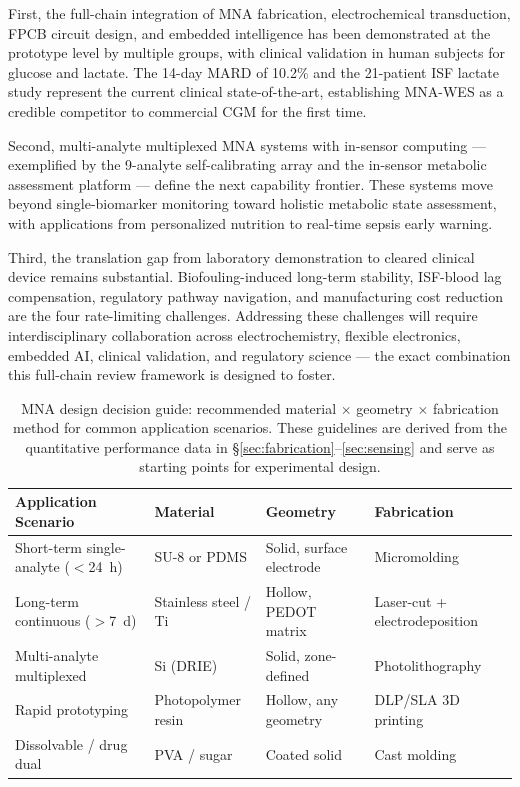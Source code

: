 \documentclass[review,1p]{elsarticle}
\begin{document}
First, the full-chain integration of MNA fabrication, electrochemical transduction, FPCB circuit design, and embedded intelligence has been demonstrated at the prototype level by multiple groups, with clinical validation in human subjects for glucose and lactate. The 14-day MARD of 10.2\% \cite{Yang2023CGM14day} and the 21-patient ISF lactate study \cite{Djassemi2026ACSsens} represent the current clinical state-of-the-art, establishing MNA-WES as a credible competitor to commercial CGM for the first time.

Second, multi-analyte multiplexed MNA systems with in-sensor computing — exemplified by the 9-analyte self-calibrating array \cite{Li2025Innovation} and the in-sensor metabolic assessment platform \cite{Fan2026EdgeAI} — define the next capability frontier. These systems move beyond single-biomarker monitoring toward holistic metabolic state assessment, with applications from personalized nutrition to real-time sepsis early warning.

Third, the translation gap from laboratory demonstration to cleared clinical device remains substantial. Biofouling-induced long-term stability, ISF-blood lag compensation, regulatory pathway navigation, and manufacturing cost reduction are the four rate-limiting challenges. Addressing these challenges will require interdisciplinary collaboration across electrochemistry, flexible electronics, embedded AI, clinical validation, and regulatory science — the exact combination this full-chain review framework is designed to foster.


\begin{table}[htbp]
\centering
\small
\caption{MNA design decision guide: recommended material $\times$ geometry $\times$ fabrication method for common application scenarios. These guidelines are derived from the quantitative performance data in \S\ref{sec:fabrication}--\ref{sec:sensing} and serve as starting points for experimental design.}
\label{tab:design_guide}
\begin{tabular}{p{3.5cm}p{3cm}p{3cm}p{3cm}}
\toprule
\textbf{Application Scenario} & \textbf{Material} & \textbf{Geometry} & \textbf{Fabrication} \\
\midrule
Short-term single-analyte ($<$24~h) & SU-8 or PDMS & Solid, surface electrode & Micromolding \\
Long-term continuous ($>$7~d) & Stainless steel / Ti & Hollow, PEDOT matrix & Laser-cut + electrodeposition \\
Multi-analyte multiplexed & Si (DRIE) & Solid, zone-defined & Photolithography \\
Rapid prototyping & Photopolymer resin & Hollow, any geometry & DLP/SLA 3D printing \\
Dissolvable / drug dual & PVA / sugar & Coated solid & Cast molding \\
\bottomrule
\end{tabular}
\end{table}
\end{document}
